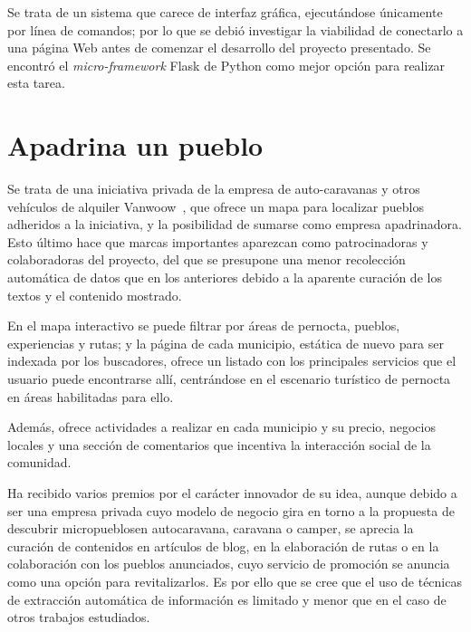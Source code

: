 Se trata de un sistema que carece de interfaz gráfica, ejecutándose únicamente por línea de comandos; por lo que se debió investigar la viabilidad de conectarlo a una página Web antes de comenzar el desarrollo del proyecto presentado. Se encontró el \textit{micro-framework} Flask de Python como mejor opción para realizar esta tarea.

\section{Apadrina un pueblo}


Se trata de una iniciativa privada de la empresa de auto-caravanas y otros vehículos de alquiler Vanwoow~\cite{apadrina_un_pueblo}, que ofrece un mapa para localizar pueblos adheridos a la iniciativa, y la posibilidad de sumarse como empresa apadrinadora. Esto último hace que marcas importantes aparezcan como patrocinadoras y colaboradoras del proyecto, del que se presupone una menor recolección automática de datos que en los anteriores debido a la aparente curación de los textos y el contenido mostrado.


En el mapa interactivo se puede filtrar por áreas de pernocta, pueblos, experiencias y rutas; y la página de cada municipio, estática de nuevo para ser indexada por los buscadores, ofrece un listado con los principales servicios que el usuario puede encontrarse allí, centrándose en el escenario turístico de pernocta en áreas habilitadas para ello.


Además, ofrece actividades a realizar en cada municipio y su precio, negocios locales y una sección de comentarios que incentiva la interacción social de la comunidad.


Ha recibido varios premios por el carácter innovador de su idea, aunque debido a ser una empresa privada cuyo modelo de negocio gira en torno a la propuesta de descubrir \guillemotleft micropueblos\guillemotright\space en \guillemotleft autocaravana, caravana o camper\guillemotright, se aprecia la curación de contenidos en artículos de blog, en la elaboración de rutas o en la colaboración con los pueblos anunciados, cuyo servicio de promoción se anuncia como una opción para revitalizarlos. Es por ello que se cree que el uso de técnicas de extracción automática de información es limitado y menor que en el caso de otros trabajos estudiados.

